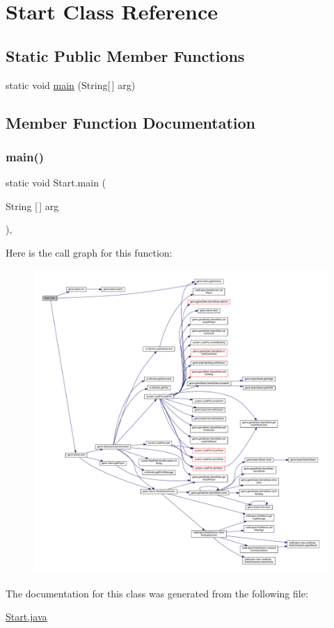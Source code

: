 \hypertarget{class_start}{}\section{Start Class Reference}
\label{class_start}
\subsection*{Static Public Member Functions}
\begin{DoxyCompactItemize}
\item 
static void \mbox{\hyperlink{class_start_a800d84a8bb736ccfea7f5595625390e8}{main}} (String\mbox{[}$\,$\mbox{]} arg)
\end{DoxyCompactItemize}


\subsection{Member Function Documentation}
\mbox{\label{class_start_a800d84a8bb736ccfea7f5595625390e8}} 
\subsubsection{\texorpdfstring{main()}{main()}}
{\footnotesize\ttfamily static void Start.\+main (\begin{DoxyParamCaption}\item[{String \mbox{[}$\,$\mbox{]}}]{arg }\end{DoxyParamCaption})\hspace{0.3cm}{\ttfamily [inline]}, {\ttfamily [static]}}

Here is the call graph for this function\+:
\nopagebreak
\begin{figure}[H]
\begin{center}
\leavevmode
\includegraphics[width=350pt]{class_start_a800d84a8bb736ccfea7f5595625390e8_cgraph}
\end{center}
\end{figure}


The documentation for this class was generated from the following file\+:\begin{DoxyCompactItemize}
\item 
\mbox{\hyperlink{_start_8java}{Start.\+java}}\end{DoxyCompactItemize}
